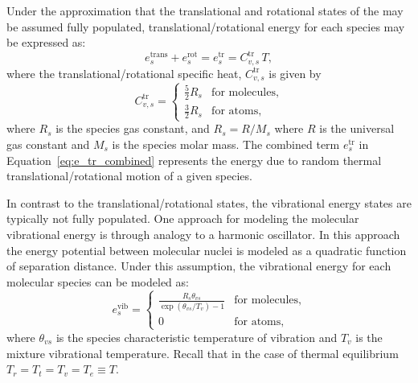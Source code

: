 \documentclass[10pt]{article}
\begin{document}
Under the approximation that the translational and rotational states of the may be assumed fully populated, translational/rotational energy for each species may be expressed as:
\begin{equation}
 \label{eq:e_tr_combined}
 e^{\text{trans}}_s + e^{\text{rot}}_s = e^{\text{tr}}_s = C^{\text{tr}}_{v,s}\, T ,
\end{equation}
where the translational/rotational specific heat, $C^{\text{tr}}_{v,s}$ is given by
\begin{equation*}
 C^{\text{tr}}_{v,s} =
 \begin{cases}
 \frac{5}{2} R_s & \text{for molecules}, \\
 \frac{3}{2} R_s & \text{for atoms},
 \end{cases}
\end{equation*}
where $R_s$ is the species gas constant, and $R_s = R/M_s$ where $R$ is the universal gas constant and $M_s$ is the species molar mass. The combined term $e^{\text{tr}}_s$ in Equation~\eqref{eq:e_tr_combined} represents the energy due to random thermal translational/rotational motion of a given species.

In contrast to the translational/rotational states, the vibrational energy states are typically not fully populated. One approach for modeling the molecular vibrational energy is through analogy to a harmonic oscillator.  In this approach the energy potential between molecular nuclei is modeled as a quadratic function of separation distance.  Under this assumption, the vibrational energy for each molecular species can be modeled as:
\begin{equation*}
  \label{eq:species_vibrational_energy}
  e^{\text{vib}}_s = 
  \begin{cases}    
    \frac{R_s\theta_{vs}}{\exp\left(\theta_{vs}/T_v\right) - 1} & \text{for molecules}, \\
    0 & \text{for atoms},
  \end{cases}
\end{equation*}
where $\theta_{vs}$ is the species characteristic temperature of vibration and $T_v$ is the mixture vibrational temperature.
Recall that in the case of thermal equilibrium $T_r=T_t=T_v=T_e\equiv T$.%
\end{document}
